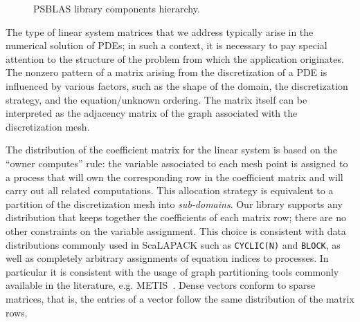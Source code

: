 \begin{figure}[h]
\begin{center}
\fi
\end{center}
\caption{PSBLAS library components hierarchy.\label{fig:psblas}}
\end{figure}


The type of linear system matrices that we address  typically arise in the
numerical solution of PDEs;  in such a context,
it is necessary to pay special attention to the
structure of the problem from which the application originates. 
The nonzero pattern of a matrix arising from the
discretization of a PDE is influenced by various factors, such as the
shape of the  domain, the discretization strategy, and
the equation/unknown ordering. The matrix itself can be interpreted as
the  adjacency matrix of the graph associated with the discretization
mesh. 

The distribution of the coefficient matrix for the linear system is
based on the ``owner computes'' rule: 
the variable associated to each mesh point is assigned to a process
that will  own the corresponding row in the coefficient matrix and
will  carry out all related computations. This allocation strategy 
is equivalent to a partition of the discretization mesh into {\em
sub-domains}. 
Our library  supports any distribution that keeps together 
the coefficients of each matrix row; there are no other constraints on
the variable assignment. 
This choice is consistent with  data distributions commonly used in
ScaLAPACK  such as  \verb|CYCLIC(N)| and \verb|BLOCK|, 
as well as completely arbitrary assignments of
equation indices to processes. In particular it is consistent with the
usage of graph partitioning tools commonly available in the
literature, e.g. METIS~\cite{METIS}.
Dense vectors  conform  to sparse
matrices, that is, the entries of a vector follow the same distribution
of the matrix rows.  

